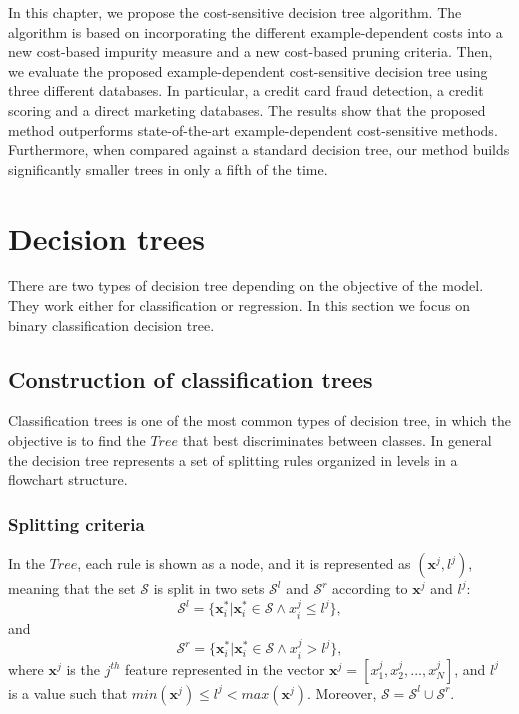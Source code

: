 In this chapter, we propose the cost-sensitive decision tree algorithm. The algorithm is 
based on incorporating the different example-dependent costs into a new cost-based impurity measure 
and a new cost-based pruning criteria. Then, we evaluate the proposed example-dependent 
cost-sensitive decision tree using three different databases. In particular, a credit card fraud 
detection, a credit scoring and a direct marketing databases. The results show that the proposed 
method outperforms state-of-the-art example-dependent cost-sensitive methods. Furthermore, when 
compared against a standard decision tree, our method builds significantly smaller trees in only a 
fifth of the time.

\section{Decision trees}
\label{sec:8:dt}

There are two types of decision tree depending on the objective of the model. They work either for 
classification or regression. In this section we focus on binary classification decision tree.

\subsection{Construction of classification trees}

Classification trees is one of the most common types of decision tree, in which the objective 
is to find the $Tree$ that best discriminates between classes. In general the decision tree 
represents a set of splitting rules organized in levels in a flowchart structure.

\subsubsection{Splitting criteria}

In the $Tree$, each rule is shown as a node, and it is represented as $(\mathbf{x}^j,l^j)$, meaning 
that the 
set $\mathcal{S}$ is split in two sets $\mathcal{S}^l$ and $\mathcal{S}^r$ according to 
$\mathbf{x}^j$ and $l^j$:
\begin{equation}
  \mathcal{S}^l = \{\mathbf{x}_i^* \vert \mathbf{x}_i^* \in \mathcal{S} \wedge x^j_i \le l^j \},
\end{equation}
and
\begin{equation}
  \mathcal{S}^r = \{\mathbf{x}_i^* \vert \mathbf{x}_i^* \in \mathcal{S} \wedge x^j_i > l^j \},
\end{equation}
where $\mathbf{x}^j$ is the $j^{th}$ feature represented in the vector 
$\mathbf{x}^j=[x_1^j,x_2^j,...,x_N^j]$, and $l^j$ is a value such that $min(\mathbf{x}^j) \le l^j < 
max(\mathbf{x}^j)$. Moreover, $\mathcal{S} = \mathcal{S}^l \cup \mathcal{S}^r$.

